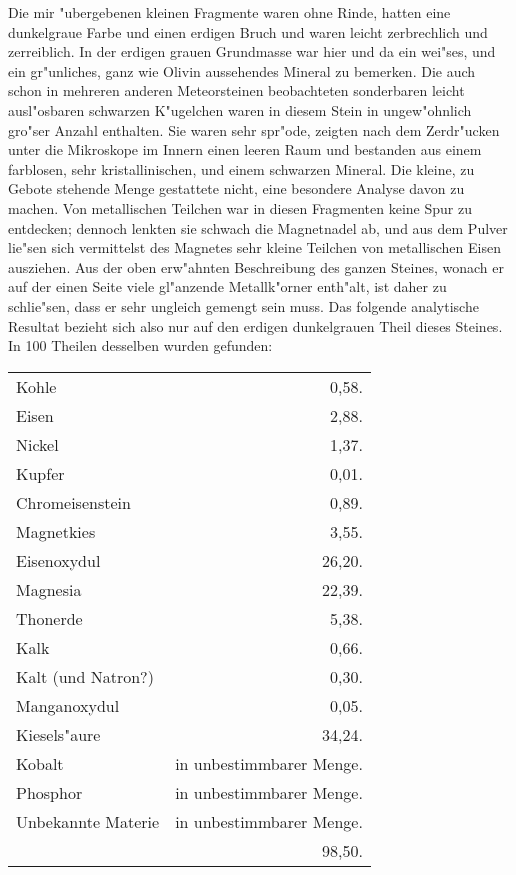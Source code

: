\documentclass[a4paper, 11pt, oneside]{article}
\begin{document}
Die mir "ubergebenen kleinen Fragmente waren ohne Rinde, hatten eine dunkelgraue Farbe und einen erdigen Bruch und waren leicht zerbrechlich und zerreiblich. In der erdigen grauen Grundmasse war hier und da ein wei"ses, und ein gr"unliches, ganz wie Olivin aussehendes Mineral zu bemerken. Die auch schon in mehreren anderen Meteorsteinen beobachteten sonderbaren leicht ausl"osbaren schwarzen K"ugelchen waren in diesem Stein in ungew"ohnlich gro"ser Anzahl enthalten. Sie waren sehr spr"ode, zeigten nach dem Zerdr"ucken unter die Mikroskope im Innern einen leeren Raum und bestanden aus einem farblosen, sehr kristallinischen, und einem schwarzen Mineral. Die kleine, zu Gebote stehende Menge gestattete nicht, eine besondere Analyse davon zu machen. Von metallischen Teilchen war in diesen Fragmenten keine Spur zu entdecken; dennoch lenkten sie schwach die Magnetnadel ab, und aus dem Pulver lie"sen sich vermittelst des Magnetes sehr kleine Teilchen von metallischen Eisen ausziehen. Aus der oben erw"ahnten Beschreibung des ganzen Steines, wonach er auf der einen Seite viele gl"anzende Metallk"orner enth"alt, ist daher zu schlie"sen, dass er sehr ungleich gemengt sein muss. Das folgende analytische Resultat bezieht sich also nur auf den erdigen dunkelgrauen Theil dieses Steines. In 100 Theilen desselben wurden gefunden:
\begin{center}
    \begin{tabular}{ l r } 
    Kohle & 0,58.\\
    Eisen & 2,88.\\
    Nickel & 1,37.\\
    Kupfer & 0,01.\\
    Chromeisenstein & 0,89.\\
    Magnetkies & 3,55.\\
    Eisenoxydul & 26,20.\\
    Magnesia & 22,39.\\
    Thonerde & 5,38.\\
    Kalk & 0,66.\\
    Kalt (und Natron?) & 0,30.\\
    Manganoxydul & 0,05.\\
    Kiesels"aure & 34,24.\\
    Kobalt & in unbestimmbarer Menge.\\
    Phosphor & in unbestimmbarer Menge.\\
    Unbekannte Materie & in unbestimmbarer Menge.\\
     & 98,50.\\
    \end{tabular}
\end{center}
\end{document}
